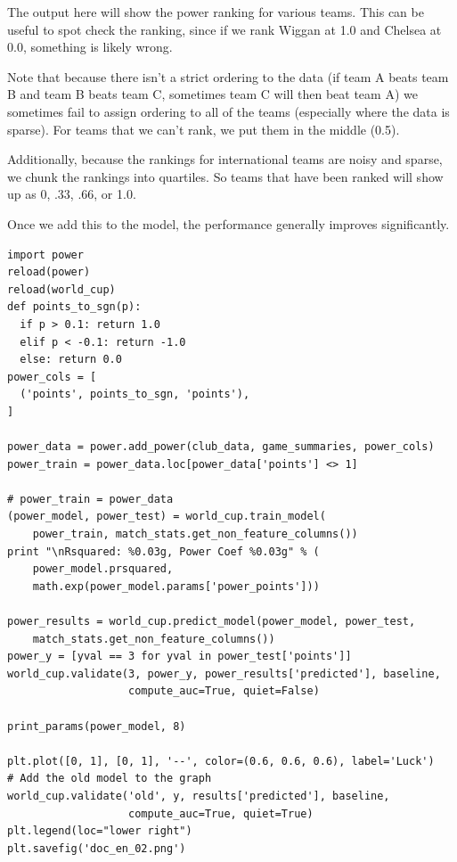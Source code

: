\documentclass[12pt,fleqn]{article}\usepackage{common}
\begin{document}
The output here will show the power ranking for various teams. This can be
useful to spot check the ranking, since if we rank Wiggan at 1.0 and
Chelsea at 0.0, something is likely wrong.

Note that because there isn't a strict ordering to the data (if team A
beats team B and team B beats team C, sometimes team C will then beat team
A) we sometimes fail to assign ordering to all of the teams (especially
where the data is sparse). For teams that we can't rank, we put them in the
middle (0.5).

Additionally, because the rankings for international teams are noisy and
sparse, we chunk the rankings into quartiles. So teams that have been
ranked will show up as 0, .33, .66, or 1.0.

Once we add this to the model, the performance generally improves significantly.

\begin{verbatim}
import power
reload(power)
reload(world_cup)
def points_to_sgn(p):
  if p > 0.1: return 1.0
  elif p < -0.1: return -1.0
  else: return 0.0
power_cols = [
  ('points', points_to_sgn, 'points'),
]

power_data = power.add_power(club_data, game_summaries, power_cols)
power_train = power_data.loc[power_data['points'] <> 1] 

# power_train = power_data
(power_model, power_test) = world_cup.train_model(
    power_train, match_stats.get_non_feature_columns())
print "\nRsquared: %0.03g, Power Coef %0.03g" % (
    power_model.prsquared, 
    math.exp(power_model.params['power_points']))

power_results = world_cup.predict_model(power_model, power_test, 
    match_stats.get_non_feature_columns())
power_y = [yval == 3 for yval in power_test['points']]
world_cup.validate(3, power_y, power_results['predicted'], baseline, 
                   compute_auc=True, quiet=False)

print_params(power_model, 8)

plt.plot([0, 1], [0, 1], '--', color=(0.6, 0.6, 0.6), label='Luck')
# Add the old model to the graph
world_cup.validate('old', y, results['predicted'], baseline, 
                   compute_auc=True, quiet=True)
plt.legend(loc="lower right")
plt.savefig('doc_en_02.png')
\end{verbatim}
\end{document}
